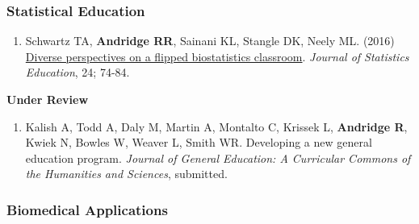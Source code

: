 \documentclass[
  english,
  letterpaper,
  DIV=11,
  numbers=noendperiod]{scrartcl}
\providecommand{\tightlist}{%
  \setlength{\itemsep}{0pt}\setlength{\parskip}{0pt}}
\begin{document}
\subsubsection{Statistical Education}\label{statistical-education}

\begin{enumerate}
\def\labelenumi{\arabic{enumi}.}
\tightlist
\item
  Schwartz TA, \textbf{Andridge RR}, Sainani KL, Stangle DK, Neely ML.
  (2016) \href{https://doi.org/10.1080/10691898.2016.1192362}{Diverse
  perspectives on a flipped biostatistics classroom}. \emph{Journal of
  Statistics Education}, 24; 74-84.
\end{enumerate}

\textbf{Under Review}

\begin{enumerate}
\def\labelenumi{\arabic{enumi}.}
\tightlist
\item
  Kalish A, Todd A, Daly M, Martin A, Montalto C, Krissek L,
  \textbf{Andridge R}, Kwiek N, Bowles W, Weaver L, Smith WR. Developing
  a new general education program. \emph{Journal of General Education: A
  Curricular Commons of the Humanities and Sciences}, submitted.
\end{enumerate}

\subsubsection{Biomedical Applications}\label{biomedical-applications}
\end{document}
